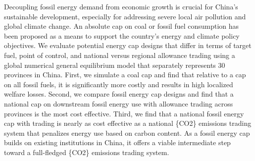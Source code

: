Decoupling fossil energy demand from economic growth is crucial for China's sustainable development, especially for addressing severe local air pollution and global climate change. An absolute cap on coal or fossil fuel consumption has been proposed as a means to support the country's energy and climate policy objectives. We evaluate potential energy cap designs that differ in terms of target fuel, point of control, and national versus regional allowance trading using a global numerical general equilibrium model that separately represents 30 provinces in China. First, we simulate a coal cap and find that relative to a cap on all fossil fuels, it is significantly more costly and results in high localized welfare losses. Second, we compare fossil energy cap designs and find that a national cap on downstream fossil energy use with allowance trading across provinces is the most cost effective. Third, we find that a national fossil energy cap with trading is nearly as cost effective as a national \{CO2\} emissions trading system that penalizes energy use based on carbon content. As a fossil energy cap builds on existing institutions in China, it offers a viable intermediate step toward a full-fledged \{CO2\} emissions trading system.
